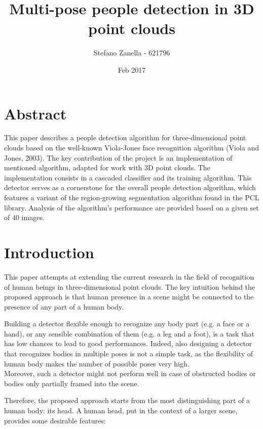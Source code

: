 \documentclass[a4paper,11pt,titlepage]{article}
\begin{document}
\title{Multi-pose people detection in 3D point clouds}
\author{Stefano Zanella - 621796}
\date{Feb 2017}

\maketitle

\section{Abstract}
This paper describes a people detection algorithm for three-dimensional point
clouds based on the well-known Viola-Jones face recognition algorithm (Viola and
Jones, 2003). The key contribution of the project is an implementation of
mentioned algorithm, adapted for work with 3D point clouds. The implementation
consists in a cascaded classifier and its training algorithm. This detector
serves as a cornerstone for the overall people detection algorithm, which
features a variant of the region-growing segmentation algorithm found in the PCL
library. Analysis of the algorithm's performance are provided based on a
given set of 40 images.

\newpage

\section{Introduction}
This paper attempts at extending the current research in the field of
recognition of human beings in three-dimensional point clouds. The key intuition
behind the proposed approach is that human presence in a scene might be
connected to the presence of any part of a human body.

Building a detector flexible enough to recognize any body part (e.g. a face or a
hand), or any sensible combination of them (e.g. a leg and a foot), is a task
that has low chances to lead to good performances. Indeed, also designing a
detector that recognizes bodies in multiple poses is not a simple task, as the
flexibility of human body makes the number of possible poses very high. \\
Moreover, such a detector might not perform well in case of obstructed bodies or
bodies only partially framed into the scene.

Therefore, the proposed approach starts from the most distinguishing part of
a human body: its head. A human head, put in the context of a larger scene,
provides some desirable features:
\end{document}

